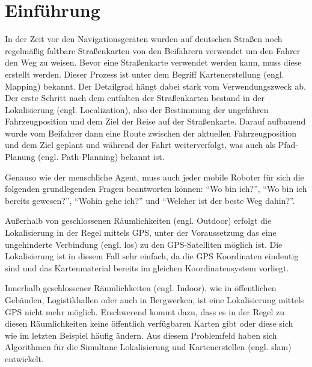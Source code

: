\chapter{Einführung}

In der Zeit vor den Navigationsgeräten wurden auf deutschen Straßen noch regelmäßig faltbare Straßenkarten von den Beifahrern verwendet um den Fahrer den Weg zu weisen. Bevor eine Straßenkarte verwendet werden kann, muss diese erstellt werden. Dieser Prozess ist unter dem Begriff Kartenerstellung (engl. Mapping) bekannt. Der Detailgrad hängt dabei stark vom Verwendungszweck ab. Der erste Schritt nach dem entfalten der Straßenkarten bestand in der Lokalisierung (engl. Localization), also der Bestimmung der ungefähren Fahrzeugposition und dem Ziel der Reise auf der Straßenkarte. Darauf aufbauend wurde vom Beifahrer dann eine Route zwischen der aktuellen Fahrzeugposition und dem Ziel geplant und während der Fahrt weiterverfolgt, was auch als Pfad-Planung (engl. Path-Planning) bekannt ist.

Genauso wie der menschliche Agent, muss auch jeder mobile Roboter für sich die folgenden grundlegenden Fragen beantworten können: \enquote{Wo bin ich?}, \enquote{Wo bin ich bereits gewesen?}, \enquote{Wohin gehe ich?} und \enquote{Welcher ist der beste Weg dahin?}. \cite{murphy2000introduction}

Außerhalb von geschlossenen Räumlichkeiten (engl. Outdoor) erfolgt die Lokalisierung in der Regel mittels GPS, unter der Voraussetzung das eine ungehinderte Verbindung (engl. \gls{los}) zu den GPS-Satelliten möglich ist. Die Lokalisierung ist in diesem Fall sehr einfach, da die GPS Koordinaten eindeutig sind und das Kartenmaterial bereits im gleichen Koordinatensystem vorliegt.

Innerhalb geschlossener Räumlichkeiten (engl. Indoor), wie in öffentlichen Gebäuden, Logistikhallen oder auch in Bergwerken, ist eine Lokalisierung mittels GPS nicht mehr möglich. Erschwerend kommt dazu, dass es in der Regel zu diesen Räumlichkeiten keine öffentlich verfügbaren Karten gibt oder diese sich wie im letzten Beispiel häufig ändern. Aus diesem Problemfeld haben sich Algorithmen für die Simultane Lokalisierung und Kartenerstellen (engl. \Gls{slam}) entwickelt.

